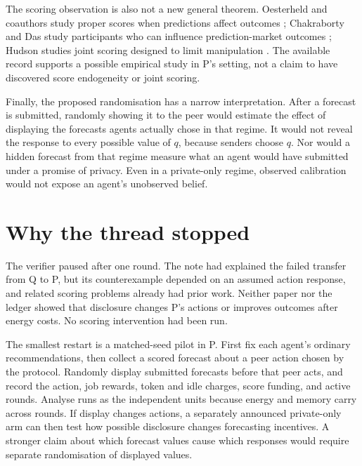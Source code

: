 \documentclass{article}
\begin{document}
The scoring observation is also not a new general theorem. Oesterheld and coauthors study proper scores when
predictions affect outcomes \cite{oesterheld}; Chakraborty and Das study participants who can influence
prediction-market outcomes \cite{chakraborty}; Hudson studies joint scoring designed to limit manipulation
\cite{hudson}. The available record supports a possible empirical study in P's setting, not a claim to have
discovered score endogeneity or joint scoring.

Finally, the proposed randomisation has a narrow interpretation. After a forecast is submitted, randomly
showing it to the peer would estimate the effect of displaying the forecasts agents actually chose in that
regime. It would not reveal the response to every possible value of \(q\), because senders choose \(q\). Nor
would a hidden forecast from that regime measure what an agent would have submitted under a promise of
privacy. Even in a private-only regime, observed calibration would not expose an agent's unobserved belief.

\section{Why the thread stopped}

The verifier paused after one round. The note had explained the failed transfer from Q to P, but its
counterexample depended on an assumed action response, and related scoring problems already had prior work.
Neither paper nor the ledger showed that disclosure changes P's actions or improves outcomes after energy
costs. No scoring intervention had been run.

The smallest restart is a matched-seed pilot in P. First fix each agent's ordinary recommendations, then
collect a scored forecast about a peer action chosen by the protocol. Randomly display submitted forecasts
before that peer acts, and record the action, job rewards, token and idle charges, score funding, and active
rounds. Analyse runs as the independent units because energy and memory carry across rounds. If display
changes actions, a separately announced private-only arm can then test how possible disclosure changes
forecasting incentives. A stronger claim about which forecast values cause which responses would require
separate randomisation of displayed values.



\end{document}
